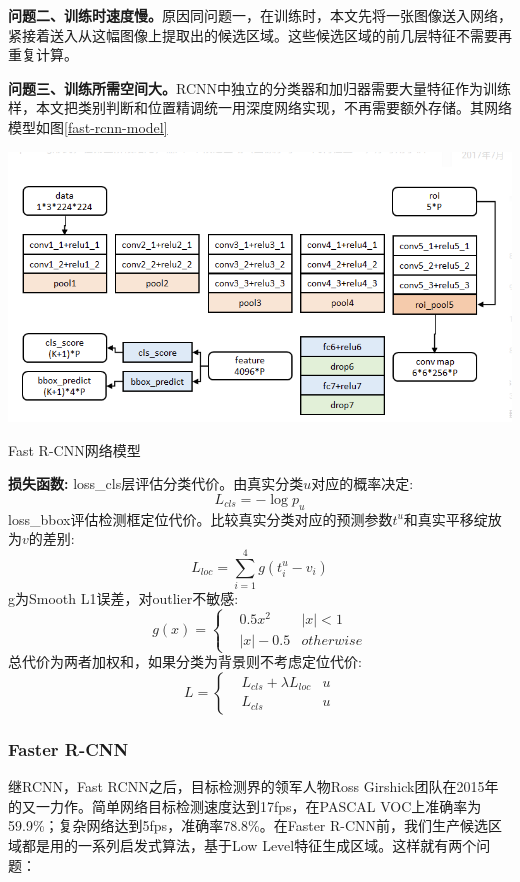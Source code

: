 \textbf{问题二、训练时速度慢。}原因同问题一，在训练时，本文先将一张图像送入网络，紧接着送入从这幅图像上提取出的候选区域。这些候选区域的前几层特征不需要再重复计算。

\textbf{问题三、训练所需空间大。}RCNN中独立的分类器和加归器需要大量特征作为训练样，本文把类别判断和位置精调统一用深度网络实现，不再需要额外存储。其网络模型如图\ref{fast-rcnn-model}

\begin{uscfigure}
	\includegraphics[width=\textwidth]{./Pictures/fast-rcnn-model.png}	
	\caption{Fast R-CNN网络模型}	
	\label{fast-rcnn-model}
\end{uscfigure}

\textbf{损失函数:}
loss\_cls层评估分类代价。由真实分类$u$对应的概率决定:
\[
	L_{cls} = - \log p_u
\]
loss\_bbox评估检测框定位代价。比较真实分类对应的预测参数$t^u$和真实平移绽放为$v$的差别:
\[
	L_{loc} = \sum_{i=1}^{4} g(t_i^u - v_i)
\]
g为Smooth L1误差，对outlier不敏感:
\begin{equation}
	g(x) = \left \{
		\begin{aligned}
		& 0.5x^2 	 & |x| < 1	\\	
		& |x| - 0.5  &otherwise
		\end{aligned}
		\right .
\end{equation}
总代价为两者加权和，如果分类为背景则不考虑定位代价:
\begin{equation}
	L = \left \{
		\begin{aligned}
		& L_{cls} + \lambda L_{loc} & u\\
		& L_{cls} 					& u
		\end{aligned}
	\right .
\end{equation}
\subsubsection{Faster R-CNN}
继RCNN，Fast RCNN之后，目标检测界的领军人物Ross Girshick团队在2015年的又一力作。简单网络目标检测速度达到17fps，在PASCAL VOC上准确率为59.9\%；复杂网络达到5fps，准确率78.8\%。在Faster R-CNN前，我们生产候选区域都是用的一系列启发式算法，基于Low Level特征生成区域。这样就有两个问题：

